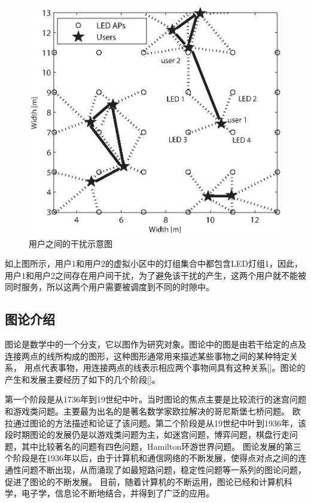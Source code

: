 \begin{figure}[htbp]
    \centering
	\includegraphics[width=\textwidth]{figures/chapter-5/UserInterferenceShow.eps}
	\caption{用户之间的干扰示意图}
	\label{fig:user-interference-show}
\end{figure}

如上图所示，用户1和用户2的虚拟小区中的灯组集合中都包含LED灯组1，因此，用户1和用户2之间存在用户间干扰，为了避免该干扰的产生，这两个用户就不能被同时服务，所以这两个用户需要被调度到不同的时隙中。

\subsection{图论介绍}
图论是数学中的一个分支，它以图作为研究对象。图论中的图是由若干给定的点及连接两点的线所构成的图形，这种图形通常用来描述某些事物之间的某种特定关系，
用点代表事物，用连接两点的线表示相应两个事物间具有这种关系[]。图论的产生和发展主要经历了如下的几个阶段[]。

第一个阶段是从1736年到19世纪中叶。当时图论的焦点主要是比较流行的迷宫问题和游戏类问题。主要最为出名的是著名数学家欧拉解决的哥尼斯堡七桥问题。
欧拉通过图论的方法描述和论证了该问题。第二个阶段是从19世纪中叶到1936年，该段时期图论的发展仍是以游戏类问题为主，如迷宫问题，博弈问题，棋盘行走问题，其中比较著名的问题有四色问题，Hamilton环游世界问题。
图论发展的第三个阶段是在1936年以后，由于计算机和通信网络的不断发展，使得点对点之间的连通性问题不断出现，从而涌现了如最短路问题，稳定性问题等一系列的图论问题，促进了图论的不断发展。
目前，随着计算机的不断运用，图论已经和计算机科学，电子学，信息论不断地结合，并得到了广泛的应用。

